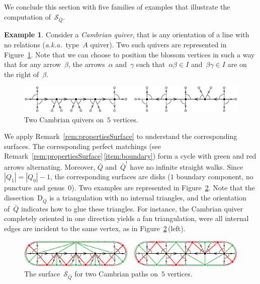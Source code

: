 \documentclass{amsart}
\theoremstyle{definition}
\newtheorem{example}[theorem]{Example}
\newcommand{\fref}[1]{Figure~\ref{#1}} %
\newcommand{\aka}{\textit{a.k.a.}~} %
\newcommand{\darkblue}{\color{darkblue}} %
\newcommand{\defn}[1]{\textsl{\darkblue #1}} %
\newcommand{\surface}{\mathcal{S}} %
\newcommand{\dissection}{\mathrm{D}} %
\newcommand{\koszul}{^!} %
\begin{document}
We conclude this section with five families of examples that illustrate the computation of~$\surface_{\bar Q}$.

\begin{example}
\label{exm:CambrianPath}
Consider a \defn{Cambrian quiver}, that is any orientation of a line with no relations (\aka type~$A$ quiver).
Two such quivers are represented in \fref{fig:CambrianPathsQuivers}.
Note that we can choose to position the blossom vertices in such a way that for any arrow~$\beta$, the arrows~$\alpha$ and~$\gamma$ such that~$\alpha\beta \in I$ and~$\beta\gamma \in I$ are on the right of~$\beta$.

\begin{figure}[h]
	\capstart
	\centerline{\includegraphics[scale=.45]{CambrianPathsQuivers}}
	\caption{Two Cambrian quivers on~$5$ vertices.}
	\label{fig:CambrianPathsQuivers}
\end{figure}

We apply Remark~\ref{rem:propertiesSurface} to understand the corresponding surfaces.
The corresponding perfect matchings (see Remark~\ref{rem:propertiesSurface}\,\eqref{item:boundary}) form a cycle with green and red arrows alternating.
Moreover, $\bar Q$ and~$\bar Q\koszul$ have no infinite straight walks.
Since~$|Q_1| = |Q_0|-1$, the corresponding surfaces are disks ($1$ boundary component, no puncture and genus~$0$).
Two examples are represented in \fref{fig:CambrianPathsSurfaces}.
Note that the dissection~$\dissection_{\bar Q}$ is a triangulation with no internal triangles, and the orientation of~$\bar Q$ indicates how to glue these triangles.
For instance, the Cambrian quiver completely oriented in one direction yields a fan triangulation, were all internal edges are incident to the same vertex, as in \fref{fig:CambrianPathsSurfaces}\,(left).

\begin{figure}[h]
	\capstart
	\centerline{\includegraphics[scale=.7]{CambrianPathsSurfaces}}
	\caption{The surface~$\surface_{\bar Q}$ for two Cambrian paths on~$5$ vertices.}
	\label{fig:CambrianPathsSurfaces}
\end{figure}
\end{example}
\end{document}
